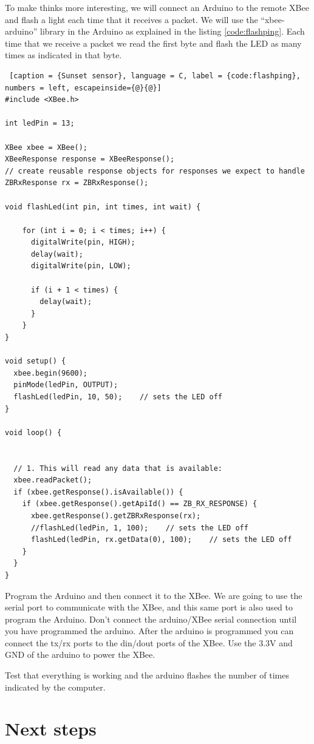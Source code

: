 To make thinks more interesting, we will connect an Arduino to the remote XBee and flash a light each time that it receives a packet.
We will use the ``xbee-arduino'' library in the Arduino as explained in the listing \ref{code:flashping}.
Each time that we receive a packet we read the first byte and flash the LED as many times as indicated in that byte.

\begin{lstlisting} [caption = {Sunset sensor}, language = C, label = {code:flashping}, numbers = left, escapeinside={@}{@}]
#include <XBee.h>

int ledPin = 13;

XBee xbee = XBee();
XBeeResponse response = XBeeResponse();
// create reusable response objects for responses we expect to handle 
ZBRxResponse rx = ZBRxResponse();

void flashLed(int pin, int times, int wait) {

    for (int i = 0; i < times; i++) {
      digitalWrite(pin, HIGH);
      delay(wait);
      digitalWrite(pin, LOW);

      if (i + 1 < times) {
        delay(wait);
      }
    }
}

void setup() {
  xbee.begin(9600);
  pinMode(ledPin, OUTPUT);
  flashLed(ledPin, 10, 50);    // sets the LED off
}

void loop() {


  // 1. This will read any data that is available:
  xbee.readPacket();
  if (xbee.getResponse().isAvailable()) {
    if (xbee.getResponse().getApiId() == ZB_RX_RESPONSE) {
      xbee.getResponse().getZBRxResponse(rx);
      //flashLed(ledPin, 1, 100);    // sets the LED off
      flashLed(ledPin, rx.getData(0), 100);    // sets the LED off
    }
  }
}
\end{lstlisting}

Program the Arduino and then connect it to the XBee. 
We are going to use the serial port to communicate with the XBee, and this same port is also used to program the Arduino.
Don't connect the arduino/XBee serial connection until you have programmed the arduino.
After the arduino is programmed you can connect the tx/rx ports to the din/dout ports of the XBee.
Use the 3.3V and GND of the arduino to power the XBee.

Test that everything is working and the arduino flashes the number of times indicated by the computer.

\section{Next steps}

